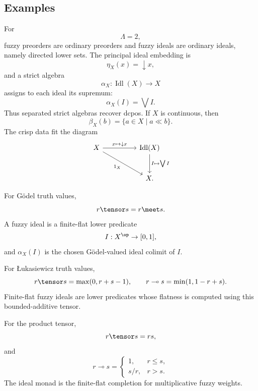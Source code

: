 \subsection{Examples}
\label{subsec:inherited-data-examples}

\begin{example}
\label{ex:inherited-data-crisp}
For
\[
    \Lambda=2,
\]
fuzzy preorders are ordinary preorders and fuzzy ideals are ordinary ideals,
namely directed lower sets. The principal ideal embedding is
\[
    \eta_X(x)=\downarrow x,
\]
and a strict algebra
\[
    \alpha_X:\operatorname{Idl}(X)\to X
\]
assigns to each ideal its supremum:
\[
    \alpha_X(I)=\bigvee I.
\]
Thus separated strict algebras recover dcpos. If \(X\) is continuous, then
\[
    \beta_X(b)=\{a\in X\mid a\ll b\}.
\]
The crisp data fit the diagram
\[
\begin{tikzcd}[column sep=huge,row sep=large]
X
    \ar[r,"x\mapsto\downarrow x"]
    \ar[dr,"1_X"']
&
\operatorname{Idl}(X)
    \ar[d,"I\mapsto\bigvee I"]
\\
&
X.
\end{tikzcd}
\]
\end{example}

\begin{example}
\label{ex:inherited-data-godel}
For G\"odel truth values,
\[
    r\tensor s=r\meet s.
\]
A fuzzy ideal is a finite-flat lower predicate
\[
    I:X^{\op}\to [0,1],
\]
and \(\alpha_X(I)\) is the chosen G\"odel-valued ideal colimit of \(I\).
\end{example}

\begin{example}
\label{ex:inherited-data-lukasiewicz}
For {\L}ukasiewicz truth values,
\[
    r\tensor s=\max(0,r+s-1),
    \qquad
    r\multimap s=\min(1,1-r+s).
\]
Finite-flat fuzzy ideals are lower predicates whose flatness is computed using
this bounded-additive tensor.
\end{example}

\begin{example}
\label{ex:inherited-data-product}
For the product tensor,
\[
    r\tensor s=rs,
\]
and
\[
    r\multimap s
    =
    \begin{cases}
    1,& r\leq s,\\
    s/r,& r>s.
    \end{cases}
\]
The ideal monad is the finite-flat completion for multiplicative fuzzy weights.
\end{example}

